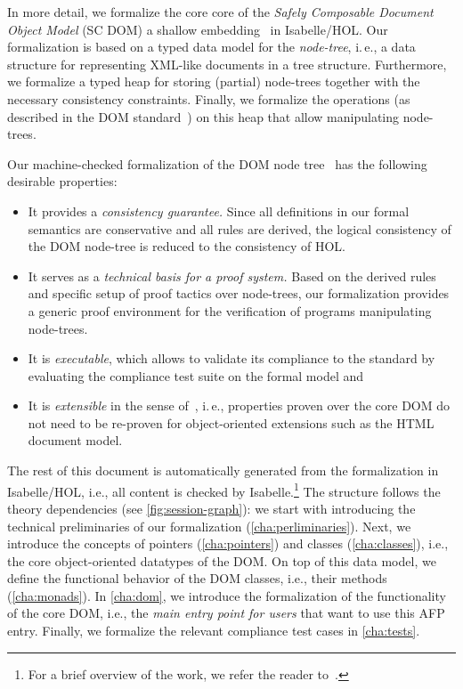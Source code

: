 \documentclass[10pt,DIV16,a4paper,abstract=true,twoside=semi,openright]
{scrreprt}
\newcommand{\ie}{i.\,e.\xspace}
\begin{document}
In more detail, we formalize the core core of the \emph{Safely
  Composable Document Object Model} (SC DOM) a shallow
embedding~\cite{joyce.ea:higher:1994} in Isabelle/HOL\@. Our
formalization is based on a typed data model for the \emph{node-tree},
\ie, a data structure for representing XML-like documents in a tree
structure. Furthermore, we formalize a typed heap for storing
(partial) node-trees together with the necessary consistency
constraints. Finally, we formalize the operations (as described in the
DOM standard~\cite{whatwg:dom:2017}) on this heap that allow
manipulating node-trees.

Our machine-checked formalization of the DOM node
tree~\cite{whatwg:dom:2017} has the following desirable properties:
\begin{itemize}
\item It provides a \emph{consistency guarantee.} Since all
  definitions in our formal semantics are conservative and all rules
  are derived, the logical consistency of the DOM node-tree is reduced
  to the consistency of HOL.
\item It serves as a \emph{technical basis for a proof system.}  Based
  on the derived rules and specific setup of proof tactics over
  node-trees, our formalization provides a generic proof environment
  for the verification of programs manipulating node-trees.
\item It is \emph{executable}, which allows to validate its compliance
  to the standard by evaluating the compliance test suite on the
  formal model and
\item It is \emph{extensible} in the sense
  of~\cite{brucker.ea:extensible:2008-b,brucker:interactive:2007},
  \ie, properties proven over the core DOM do not need to be re-proven
  for object-oriented extensions such as the HTML document model.
\end{itemize}

The rest of this document is automatically generated from the
formalization in Isabelle/HOL, i.e., all content is checked by
Isabelle.\footnote{For a brief overview of the work, we refer the
  reader to~\cite{brucker.ea:core-dom:2018,herzberg:web-components:2020}.} 
The structure follows the theory dependencies (see \autoref{fig:session-graph}): we start
with introducing the technical preliminaries of our formalization
(\autoref{cha:perliminaries}).  Next, we introduce the concepts of
pointers (\autoref{cha:pointers}) and classes (\autoref{cha:classes}),
i.e., the core object-oriented datatypes of the DOM. On top of this
data model, we define the functional behavior of the DOM classes,
i.e., their methods (\autoref{cha:monads}). In \autoref{cha:dom}, we
introduce the formalization of the functionality of the core DOM,
i.e., the \emph{main entry point for users} that want to use this AFP
entry. Finally, we formalize the relevant compliance test cases in
\autoref{cha:tests}.
\end{document}
